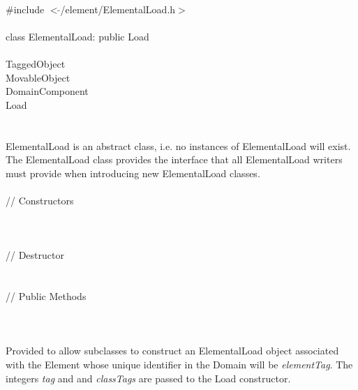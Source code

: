 
   \\
\indent \#include $<\tilde{ }$/element/ElementalLoad.h$>$  \\

  \\
\indent class ElementalLoad: public Load \\

 \\
\indent TaggedObject \\
\indent MovableObject \\
\indent\indent DomainComponent \\
\indent\indent\indent Load \\
\indent\indent\indent{} \\

  \\
\indent ElementalLoad is an abstract class, i.e. no instances of
ElementalLoad will exist. The ElementalLoad class provides the
interface that all ElementalLoad writers must provide when
introducing new ElementalLoad classes. \\ 

 \\
\indent\indent // Constructors \\
\indent{}  \\ 
\indent{}  \\ \\
\indent\indent // Destructor \\
\indent{}\\ \\
\indent\indent // Public Methods  \\
\indent{} \\



  \\
  \\
Provided to allow subclasses to construct an ElementalLoad object
associated with the Element whose unique identifier in the Domain will
be {\em elementTag}. The integers {\em tag} and and {\em classTags}
are passed to the Load constructor. \\ 

